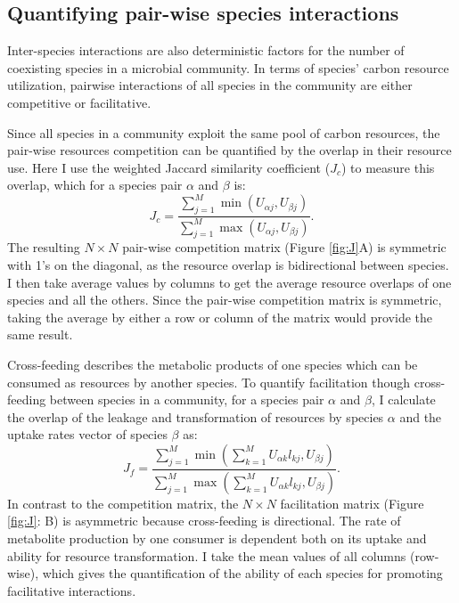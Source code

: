 \documentclass[11pt, a4paper]{article}
\begin{document}
\begin{spacing}{1.5}
\subsection{Quantifying pair-wise species interactions}

Inter-species interactions are also deterministic factors for the number of coexisting species in a microbial community. In terms of species' carbon resource utilization, pairwise interactions of all species in the community are either competitive or facilitative. 

Since all species in a community exploit the same pool of carbon resources, the pair-wise resources competition can be quantified by the overlap in their resource use. Here I use the weighted Jaccard similarity coefficient  ($J_c$) to measure this overlap, which for a species pair $\alpha$ and $\beta$ is: 
\begin{equation*}\label{eq:c}
    J_c = \frac{\sum\limits_{j=1}^M \min (U_{\alpha j},U_{\beta j})}{\sum\limits_{j=1}^M \max (U_{\alpha j},U_{\beta j})}.
\end{equation*}
The resulting $N \times N$ pair-wise competition matrix (Figure \ref{fig:J}A) is symmetric with 1's on the diagonal, as the resource overlap is bidirectional between species. I then take average values by columns to get the average resource overlaps of one species and all the others. Since the pair-wise competition matrix is symmetric, taking the average by either a row or column of the matrix would provide the same result.

Cross-feeding describes the metabolic products of one species which can be consumed as resources by another species. To quantify facilitation though cross-feeding between species in a community, for a species pair $\alpha$ and $\beta$, I calculate the overlap of the leakage and transformation of resources by species $\alpha$ and the uptake rates vector of species $\beta$ as:
\begin{equation*}\label{eq:f}
    J_f = \frac{\sum\limits_{j=1}^M \min\left(\sum\limits_{k=1}^M U_{\alpha k}l_{kj},U_{\beta j}\right)}{\sum\limits_{j=1}^M \max\left(\sum\limits_{k=1}^M U_{\alpha k}l_{kj},U_{\beta j}\right)}.
\end{equation*}
In contrast to the competition matrix, the $N \times N$ facilitation matrix (Figure \ref{fig:J}: B) is asymmetric because cross-feeding is directional. The rate of metabolite production by one consumer is dependent both on its uptake and ability for resource transformation. I take the mean values of all columns (row-wise), which gives the quantification of the ability of each species for promoting facilitative interactions. 


\end{spacing}
\end{document}
